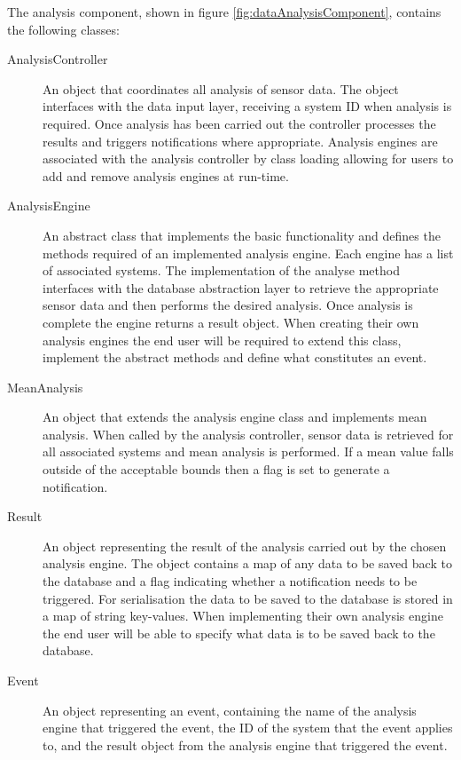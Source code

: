 \documentclass[10pt,a4paper]{article}
\begin{document}
The analysis component, shown in figure
\ref{fig:dataAnalysisComponent}, contains the following classes:

\begin{description}
  \item [AnalysisController] An object that coordinates all analysis of
    sensor data. The object interfaces with the data input layer,
    receiving a system ID when analysis is required. Once analysis has
    been carried out the controller processes the results and triggers
    notifications where appropriate. Analysis engines are associated
    with the analysis controller by class loading allowing for users to
    add and remove analysis engines at run-time.

  \item [AnalysisEngine] An abstract class that implements the basic
    functionality and defines the methods required of an implemented
    analysis engine. Each engine has a list of associated systems. The
    implementation of the analyse method interfaces with the database
    abstraction layer to retrieve the appropriate sensor data and then
    performs the desired analysis. Once analysis is complete the engine 
    returns a result object. When creating their own analysis 
    engines the end user will be required to extend this class, implement 
    the abstract methods and define what constitutes an event.

  \item [MeanAnalysis] An object that extends the analysis engine
    class and implements mean analysis. When called by the analysis
    controller, sensor data is retrieved for all associated systems
    and mean analysis is performed. If a mean value falls outside of
    the acceptable bounds then a flag is set to generate a notification.

  \item [Result] An object representing the result of the analysis
    carried out by the chosen analysis engine. The object contains a
    map of any data to be saved back to the database and a flag
    indicating whether a notification needs to be triggered. For
    serialisation the data to be saved to the database is stored in a
    map of string key-values. When implementing their own analysis
    engine the end user will be able to specify what data is to be
    saved back to the database.

  \item [Event] An object representing an event,
    containing the name of the analysis engine that triggered the
    event, the ID of the system that the event applies
    to, and the result object from the analysis engine that triggered
    the event.
\end{description}
\end{document}
